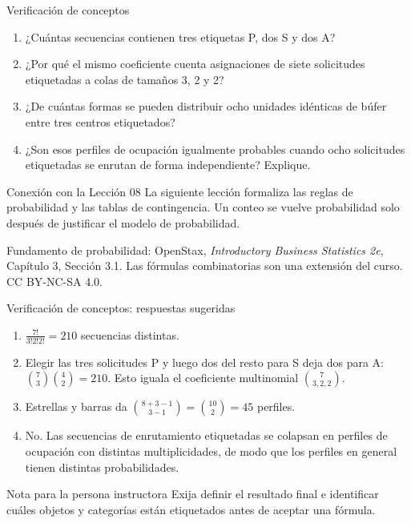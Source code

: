 \documentclass[aspectratio=169,10pt,spanish]{beamer}
\begin{document}
\begin{frame}{Verificación de conceptos}
  \begin{enumerate}
    \item ¿Cuántas secuencias contienen tres etiquetas P, dos S y dos A?
    \item ¿Por qué el mismo coeficiente cuenta asignaciones de siete
      solicitudes etiquetadas a colas de tamaños 3, 2 y 2?
    \item ¿De cuántas formas se pueden distribuir ocho unidades idénticas de
      búfer entre tres centros etiquetados?
    \item ¿Son esos perfiles de ocupación igualmente probables cuando ocho
      solicitudes etiquetadas se enrutan de forma independiente? Explique.
  \end{enumerate}

  \vspace{0.4em}
  \begin{block}{Conexión con la Lección 08}
    La siguiente lección formaliza las reglas de probabilidad y las tablas de
    contingencia. Un conteo se vuelve probabilidad solo después de justificar
    el modelo de probabilidad.
  \end{block}

  \vfill
  \scriptsize Fundamento de probabilidad: OpenStax,
  \textit{Introductory Business Statistics 2e}, Capítulo 3, Sección 3.1.
  Las fórmulas combinatorias son una extensión del curso. CC BY-NC-SA 4.0.
\end{frame}

\appendix

\begin{frame}{Verificación de conceptos: respuestas sugeridas}
  \begin{enumerate}
    \item $\frac{7!}{3!2!2!}=210$ secuencias distintas.
    \item Elegir las tres solicitudes P y luego dos del resto para S deja
      dos para A: $\binom{7}{3}\binom{4}{2}=210$. Esto iguala el
      coeficiente multinomial $\binom{7}{3,2,2}$.
    \item Estrellas y barras da
      $\binom{8+3-1}{3-1}=\binom{10}{2}=45$ perfiles.
    \item No. Las secuencias de enrutamiento etiquetadas se colapsan en
      perfiles de ocupación con distintas multiplicidades, de modo que los
      perfiles en general tienen distintas probabilidades.
  \end{enumerate}

  \begin{block}{Nota para la persona instructora}
    Exija definir el resultado final e identificar cuáles objetos y
    categorías están etiquetados antes de aceptar una fórmula.
  \end{block}
\end{frame}
\end{document}

